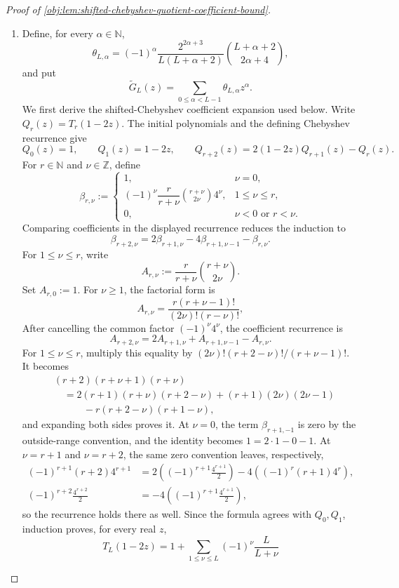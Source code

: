 \documentclass[11pt]{article}
\begin{document}
\begin{proof}[Proof of \cref{obj:lem:shifted-chebyshev-quotient-coefficient-bound}]
\begin{enumerate}
\item Define, for every \(\alpha\in\mathbb N\),
\[
\theta_{L,\alpha}
=
(-1)^\alpha
\frac{2^{2\alpha+3}}{L(L+\alpha+2)}
\binom{L+\alpha+2}{2\alpha+4},
\]
and put
\[
\widetilde G_L(z)
=
\sum_{0\le \alpha<L-1}\theta_{L,\alpha}z^\alpha .
\]
We first derive the shifted-Chebyshev coefficient expansion used below.
Write \(Q_r(z)=T_r(1-2z)\).  The initial polynomials and the defining
Chebyshev recurrence give
\[
Q_0(z)=1,\qquad Q_1(z)=1-2z,\qquad
Q_{r+2}(z)=2(1-2z)Q_{r+1}(z)-Q_r(z).
\]
For \(r\in\mathbb N\) and \(\nu\in\mathbb Z\), define
\[
\beta_{r,\nu}:=
\begin{cases}
1, & \nu=0,\\[0.3em]
(-1)^\nu\dfrac{r}{r+\nu}
\binom{r+\nu}{2\nu}4^\nu, & 1\le\nu\le r,\\[0.8em]
0, & \nu<0\text{ or }r<\nu .
\end{cases}
\]
Comparing coefficients in the displayed recurrence reduces the induction to
\[
\beta_{r+2,\nu}
=2\beta_{r+1,\nu}-4\beta_{r+1,\nu-1}-\beta_{r,\nu}.
\]
For \(1\le\nu\le r\), write
\[
A_{r,\nu}:=\frac{r}{r+\nu}\binom{r+\nu}{2\nu}.
\]
Set \(A_{r,0}:=1\).  For \(\nu\ge1\), the factorial form is
\[
A_{r,\nu}
=\frac{r(r+\nu-1)!}{(2\nu)!(r-\nu)!},
\]
After cancelling the common factor
\((-1)^\nu4^\nu\), the coefficient recurrence is
\[
A_{r+2,\nu}
=2A_{r+1,\nu}+A_{r+1,\nu-1}-A_{r,\nu}.
\]
For \(1\le\nu\le r\), multiply this equality by
\((2\nu)!(r+2-\nu)!/(r+\nu-1)!\).  It becomes
\[
\begin{aligned}
&(r+2)(r+\nu+1)(r+\nu)\\
&\quad =
2(r+1)(r+\nu)(r+2-\nu)
+(r+1)(2\nu)(2\nu-1)\\
&\qquad\quad
-r(r+2-\nu)(r+1-\nu),
\end{aligned}
\]
and expanding both sides proves it.  At \(\nu=0\), the term
\(\beta_{r+1,-1}\) is zero by the outside-range convention, and the identity
becomes \(1=2\cdot1-0-1\).  At \(\nu=r+1\) and \(\nu=r+2\), the same
zero convention leaves, respectively,
\[
\begin{aligned}
(-1)^{r+1}(r+2)4^{r+1}
&=2\left((-1)^{r+1}\frac{4^{r+1}}2\right)
-4\left((-1)^r(r+1)4^r\right),\\
(-1)^{r+2}\frac{4^{r+2}}2
&=-4\left((-1)^{r+1}\frac{4^{r+1}}2\right),
\end{aligned}
\]
so the recurrence holds there as well.  Since the formula agrees with \(Q_0,Q_1\),
induction proves, for every real \(z\),
\[
T_L(1-2z)
=
1+
\sum_{1\le \nu\le L}
(-1)^\nu\frac{L}{L+\nu}
\]
\end{enumerate}
\end{proof}
\end{document}
